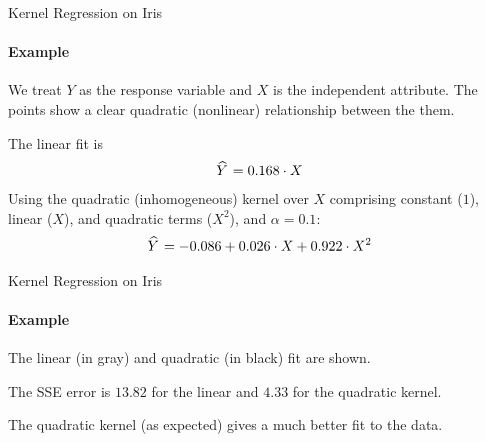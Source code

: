 \begin{frame}{Kernel Regression on Iris}
\framesubtitle{Example}
    We treat $Y$ as the response variable and $X$ is the independent
    attribute. The points show a clear quadratic (nonlinear)
    relationship between the them.

	\medskip

    The linear fit is
    \begin{align*}
        \mkern 1.5mu\widehat{\mkern-1.5muY}\mkern 1.5mu = 0.168\cdot X
    \end{align*}
    Using the quadratic (inhomogeneous) kernel over
    $X$ comprising constant ($1$), linear ($X$), and quadratic terms ($X^2$),  and $\alpha=0.1$:
    \begin{align*}
        \mkern 1.5mu\widehat{\mkern-1.5muY}\mkern 1.5mu = -0.086 + 0.026 \cdot X + 0.922 \cdot X^2
    \end{align*}
\end{frame}
\begin{frame}{Kernel Regression on Iris}
\framesubtitle{Example}
The linear (in gray) and quadratic (in black) fit are shown.
  
\medskip

The SSE error is $13.82$ for the linear and $4.33$ for the quadratic kernel.
    
\medskip

The quadratic kernel (as expected) gives a much better fit to the data. 

\medskip

\centerline{
}
\end{frame}
%
